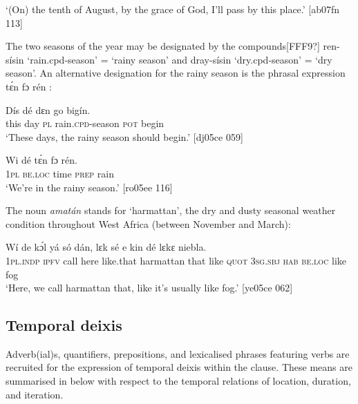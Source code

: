 \glt ‘(On) the tenth of August, by the grace of God, I’ll pass by this place.’ [ab07fn 113]
\z

The two seasons of the year may be designated by the compounds[FFF9?] ren-sísin ‘rain.cpd-season’ = ‘rainy season’  and dray-sísin ‘dry.cpd-season’ = ‘dry season’. An alternative designation for the rainy season is the phrasal expression tɛ́n fɔ rén : 


\ea%
    \label{ex:key:1005}
    \gll Dís  dé  dɛn      go  bigín.\\
this  day  \textsc{pl}  rain.\textsc{cpd}{}-season  \textsc{pot}  begin\\

\glt ‘These days, the rainy season should begin.’ [dj05ce 059]
\z


\ea%
    \label{ex:key:1006}
    \gll Wi  dé    tɛ́n    fɔ  rén.\\
\textsc{1pl}  \textsc{be.loc}  time    \textsc{prep}  rain\\

\glt ‘We’re in the rainy season.’ [ro05ee 116]
\z

The noun \textit{amatán} stands for ‘harmattan’, the dry and dusty seasonal weather condition throughout West Africa (between November and March): 


\ea%
    \label{ex:key:1007}
    \gll Wí    de  kɔ́l  yá    só        dán,    lɛk  sé 
e    kin  dé    lɛkɛ  niebla.\\
\textsc{1pl.indp}  \textsc{ipfv}  call  here    like.that  harmattan  that    like  \textsc{quot}
\textsc{3sg.sbj}  \textsc{hab}  \textsc{be.loc}  like  fog\\

\glt ‘Here, we call harmattan that, like it’s usually like fog.’ [ye05ce 062]
\z

\subsection{Temporal deixis}\label{sec:8.2.2}

Adverb(ial)s, quantifiers, prepositions, and lexicalised phrases featuring verbs are recruited for the expression of temporal deixis within the clause. These means are summarised in  below with respect to the temporal relations of location, duration, and iteration. 


